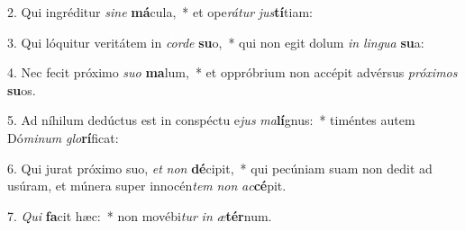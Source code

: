 2. Qui ingréditur \textit{si}\textit{ne} \textbf{má}cula,~*  et ope\textit{rá}\textit{tur} \textit{jus}\textbf{tí}tiam:\

3. Qui lóquitur veritátem in \textit{cor}\textit{de} \textbf{su}o,~*  qui non egit dolum \textit{in} \textit{lin}\textit{gua} \textbf{su}a:\

4. Nec fecit próximo \textit{su}\textit{o} \textbf{ma}lum,~*  et oppróbrium non accépit advérsus \textit{pró}\textit{xi}\textit{mos} \textbf{su}os.\

5. Ad níhilum dedúctus est in conspéctu e\textit{jus} \textit{ma}\textbf{lí}gnus:~*  timéntes autem Dó\textit{mi}\textit{num} \textit{glo}\textbf{rí}ficat:\

6. Qui jurat próximo suo, \textit{et} \textit{non} \textbf{dé}cipit,~*  qui pecúniam suam non dedit ad usúram, et múnera super innocén\textit{tem} \textit{non} \textit{ac}\textbf{cé}pit.\

7. \textit{Qui} \textbf{fa}cit hæc:~*  non movébi\textit{tur} \textit{in} \textit{æ}\textbf{tér}num.\

